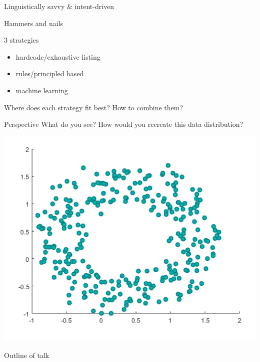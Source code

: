 \documentclass[10pt, compress]{beamer}
\begin{document}
\begin{frame}{Linguistically savvy \& intent-driven}
\end{frame}

\begin{frame}{Hammers and nails}
\end{frame}

\begin{frame}{3 strategies}
	\begin{itemize}
		\item hardcode/exhaustive listing
		\item rules/principled based
		\item machine learning
	\end{itemize}

	\pause

	Where does each strategy fit best? How to combine them?
\end{frame}

\begin{frame}{Perspective}
	What do you see? How would you recreate this data distribution?

	\includegraphics[width=.85\textwidth]{images/circleplot.png}
\end{frame}

\begin{frame}{Outline of talk}
	\tableofcontents
\end{frame}
\end{document}
